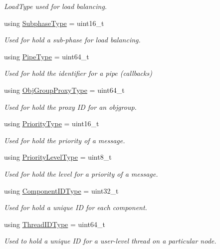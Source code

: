 \begin{DoxyCompactItemize}
\begin{DoxyCompactList}\small\item\em Load\+Type used for load balancing. \end{DoxyCompactList}\item 
using \hyperlink{namespacevt_ae78cbfdf1e57470e33eedb074f2beeba}{Subphase\+Type} = uint16\+\_\+t
\begin{DoxyCompactList}\small\item\em Used for hold a sub-\/phase for load balancing. \end{DoxyCompactList}\item 
using \hyperlink{namespacevt_ac9852acda74d1896f48f406cd72c7bd3}{Pipe\+Type} = uint64\+\_\+t
\begin{DoxyCompactList}\small\item\em Used for hold the identifier for a pipe (callbacks) \end{DoxyCompactList}\item 
using \hyperlink{namespacevt_ad7cae989df485fccca57f0792a880a8e}{Obj\+Group\+Proxy\+Type} = uint64\+\_\+t
\begin{DoxyCompactList}\small\item\em Used for hold the proxy ID for an objgroup. \end{DoxyCompactList}\item 
using \hyperlink{namespacevt_a86bff9f556eb761b27fc8600d006ac04}{Priority\+Type} = uint16\+\_\+t
\begin{DoxyCompactList}\small\item\em Used for hold the priority of a message. \end{DoxyCompactList}\item 
using \hyperlink{namespacevt_a53e07fdb3351b0f263e0dfd51b968d5e}{Priority\+Level\+Type} = uint8\+\_\+t
\begin{DoxyCompactList}\small\item\em Used for hold the level for a priority of a message. \end{DoxyCompactList}\item 
using \hyperlink{namespacevt_ab6ac935c168b809c422d5121da4f2700}{Component\+I\+D\+Type} = uint32\+\_\+t
\begin{DoxyCompactList}\small\item\em Used for hold a unique ID for each component. \end{DoxyCompactList}\item 
using \hyperlink{namespacevt_a9b887d814dd25ff495a0c8270304ac02}{Thread\+I\+D\+Type} = uint64\+\_\+t
\begin{DoxyCompactList}\small\item\em Used to hold a unique ID for a user-\/level thread on a particular node. \end{DoxyCompactList}\item 

\end{DoxyCompactItemize}
